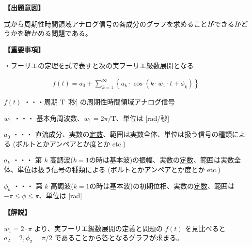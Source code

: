 \noindent \textbf{【出題意図】}

\noindent 式から周期性時間領域アナログ信号の各成分のグラフを求めることができるかどうかを確かめる問題である。

\vspace{1em}
\noindent \textbf{【重要事項】}

\medskip
\noindent ・フーリエの定理を式で表すと次の実フーリエ級数展開となる

\begin{align*}
f(t) = a_0 + \sum_{k=1}^{\infty}
\left \{
a_k \cdot \cos (k \cdot w_1 \cdot t + \phi_k)
\right \}
\end{align*}

\medskip
\noindent $f(t)$ ・・・周期 $\textrm{T}$ [秒] の周期性時間領域アナログ信号

\medskip
\noindent $w_1$ ・・・ 基本角周波数、$w_1 = 2\pi/\textrm{T}$、単位は [rad/秒]

\medskip
\noindent $a_0$ ・・・ 直流成分、実数の\underline{定数}、範囲は実数全体、単位は扱う信号の種類による (ボルトとかアンペアとか度とか etc.)

\medskip
\noindent $a_k$ ・・・ 第 $k$ 高調波($k=1$の時は基本波)の振幅、実数の\underline{定数}、範囲は実数全体、単位は扱う信号の種類による (ボルトとかアンペアとか度とか etc.)

\medskip
\noindent $\phi_k$ ・・・ 第 $k$ 高調波($k=1$の時は基本波)の初期位相、実数の\underline{定数}、範囲は $-\pi \leq \phi \leq \pi$、単位は [rad]


\vspace{1em}
\noindent \textbf{【解説】}

\noindent  $w_1=2\cdot\pi$ より、実フーリエ級数展開の定義と問題の $f(t)$ を見比べると $a_2 = 2, \phi_2 = \pi/2$ であることから答となるグラフが求まる。
